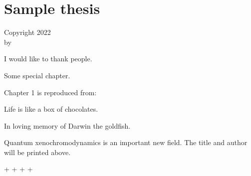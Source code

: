 
\part{Sample thesis}

\ShowTitle

\begin{Copyright}
\large
Copyright 2022\\[\bigskipamount] by\\[\bigskipamount] \GetAuthors
\end{Copyright}

\begin{Acknowledgments}
I would like to thank people.
\end{Acknowledgments}




\begin{SpecialChapter}[title=Special chapter]
Some special chapter.
\end{SpecialChapter}

\begin{Contributions}
Chapter 1 is reproduced from:\\[\smallskipamount]
\end{Contributions}

\begin{Epigraph}
\large Life is like a box of chocolates.\\
\hrulefill
\end{Epigraph}

\begin{Dedication}
In loving memory of Darwin the goldfish.
\end{Dedication}

\begin{Abstract}
Quantum xenochromodynamics is an important new field.
The title and author will be printed above.
\end{Abstract}

\ShowTableOfContents
\ShowListOfFigures+
\ShowListOfTables+
\ShowListOfAbbreviations+
\ShowNomenclature+
